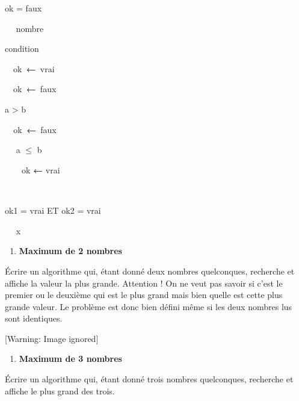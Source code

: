 {\sffamily
{} ok = faux }

{\sffamily
\ \  nombre}

{\sffamily
{}}


\bigskip

{\sffamily
{} condition }

{\sffamily
\ \ ok\texttt{ }{\textbf{←}}\texttt{ }vrai}

{\sffamily
{}}

{\sffamily
\ \ ok\texttt{ }{\textbf{←}}\texttt{ }faux}

{\sffamily
{}}


\bigskip

{\sffamily
{} a {\textgreater} b }

{\sffamily
\texttt{\ \ }ok\texttt{ }{\textbf{←}}\texttt{
}faux}

{\sffamily
{}}

{\sffamily
\ \  a ${\leq}$ b }

{\sffamily
\ \ \ \ ok {\textbf{←}} vrai}

{\sffamily
\ \ }

{\sffamily
{}}


\bigskip

{\sffamily
{} ok1 = vrai ET ok2 = vrai }

{\sffamily
\ \  x}

{\sffamily
{}}


\bigskip

\liststyleExercice
\setcounter{saveenum}{\value{enumi}}
\begin{enumerate}
\setcounter{enumi}{\value{saveenum}}
\item {\sffamily\bfseries
Maximum de 2 nombres}
\end{enumerate}
{
Écrire un algorithme qui, étant donné deux nombres quelconques,
recherche et affiche la valeur la plus grande. Attention ! On ne veut
pas savoir si c'est le premier ou le deuxième qui est
le plus grand mais bien quelle est cette plus grande valeur. Le
problème est donc bien défini même si les deux nombres lus sont
identiques.}

\begin{center}
 [Warning: Image ignored] %

\end{center}
\liststyleExercice
\setcounter{saveenum}{\value{enumi}}
\begin{enumerate}
\setcounter{enumi}{\value{saveenum}}
\item {\sffamily\bfseries
Maximum de 3 nombres}
\end{enumerate}
{
Écrire un algorithme qui, étant donné trois nombres quelconques,
recherche et affiche le plus grand des trois.}

